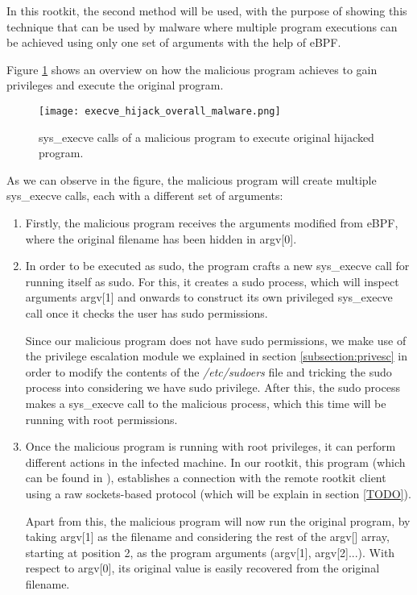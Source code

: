 In this rootkit, the second method will be used, with the purpose of showing this technique that can be used by malware where multiple program executions can be achieved using only one set of arguments with the help of eBPF.

Figure \ref{fig:execve_hijack_overall_malware} shows an overview on how the malicious program achieves to gain privileges and execute the original program.

\begin{figure}[htbp]
	\centering
	\texttt{[image: execve\_hijack\_overall\_malware.png]}
	\caption{sys\_execve calls of a malicious program to execute original hijacked program.}
	\label{fig:execve_hijack_overall_malware}
\end{figure}

As we can observe in the figure, the malicious program will create multiple sys\_execve calls, each with a different set of arguments:
\begin{enumerate}
\item Firstly, the malicious program receives the arguments modified from eBPF, where the original filename has been hidden in argv[0].
\item In order to be executed as sudo, the program crafts a new sys\_execve call for running itself as sudo. For this, it creates a sudo process, which will inspect arguments argv[1] and onwards to construct its own privileged sys\_execve call once it checks the user has sudo permissions. 

Since our malicious program does not have sudo permissions, we make use of the privilege escalation module we explained in section \ref{subsection:privesc} in order to modify the contents of the \textit{/etc/sudoers} file and tricking the sudo process into considering we have sudo privilege. After this, the sudo process makes a sys\_execve call to the malicious process, which this time will be running with root permissions.

\item Once the malicious program is running with root privileges, it can perform different actions in the infected machine. In our rootkit, this program (which can be found in ), establishes a connection with the remote rootkit client using a raw sockets-based protocol (which will be explain in section \ref{TODO}).

Apart from this, the malicious program will now run the original program, by taking argv[1] as the filename and considering the rest of the argv[] array, starting at position 2, as the program arguments (argv[1], argv[2]...). With respect to argv[0], its original value is easily recovered from the original filename. 
\end{enumerate}


